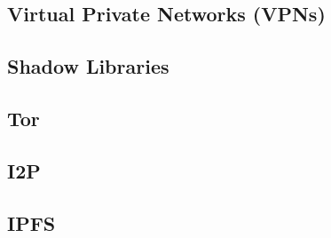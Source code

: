 \subsection{Virtual Private Networks (VPNs)}

\subsection{Shadow Libraries}

\subsection{Tor}
\subsection{I2P}

\subsection{IPFS}
